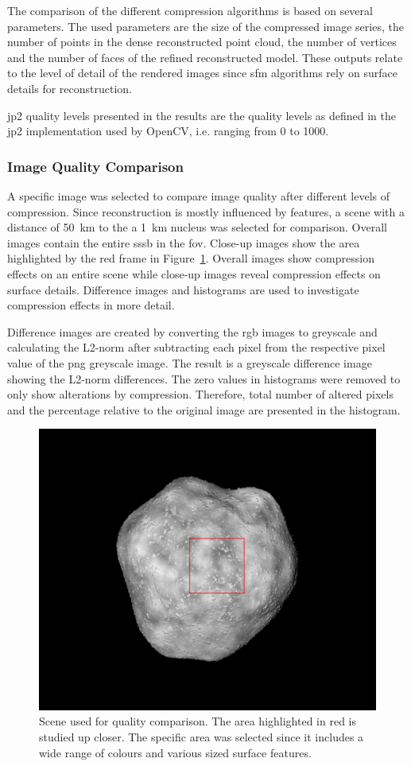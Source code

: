 The comparison of the different compression algorithms is based on several parameters. The used parameters are the size of the compressed image series, the number of points in the dense reconstructed point cloud, the number of vertices and the number of faces of the refined reconstructed model. These outputs relate to the level of detail of the rendered images since \gls{sfm} algorithms rely on surface details for reconstruction.

\Gls{jp2} quality levels presented in the results are the quality levels as defined in the \gls{jp2} implementation used by OpenCV, i.e. ranging from 0 to 1000.

\subsubsection{Image Quality Comparison} \label{sec:img_quali_comp}
A specific image was selected to compare image quality after different levels of compression. Since reconstruction is mostly influenced by features, a scene with a distance of \SI{50}{\kilo\meter} to the a \SI{1}{\kilo\meter} nucleus was selected for comparison. Overall images contain the entire \gls{sssb} in the \gls{fov}. Close-up images show the area highlighted by the red frame in Figure~\ref{fig:img_quality_frame}. Overall images show compression effects on an entire scene while close-up images reveal compression effects on surface details. Difference images and histograms are used to investigate compression effects in more detail. 

Difference images are created by converting the \gls{rgb} images to greyscale and calculating the L2-norm after subtracting each pixel from the respective pixel value of the \gls{png} greyscale image. The result is a greyscale difference image showing the L2-norm differences. The zero values in histograms were removed to only show alterations by compression. Therefore, total number of altered pixels and the percentage relative to the original image are presented in the histogram.

\begin{figure}[htb]
    \centering
    \includegraphics[width=.5\textwidth]{doc/thesis/0_figures/compare_quality/set1/jp2_1000_frame}
    \caption{Scene used for quality comparison. The area highlighted in red is studied up closer. The specific area was selected since it includes a wide range of colours and various sized surface features.}
    \label{fig:img_quality_frame}
\end{figure}

